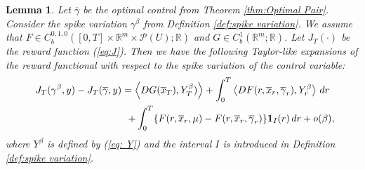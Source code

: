 \documentclass[12pt,reqno]{amsart}
\numberwithin{equation}{section}  %
\newcommand{\1}{{\bf 1}}
\newcommand{\2}{{\bf 2}}
\newcommand{\R}{\mathbb R}
\newcommand{\ga}{\gamma}
\newtheorem{lemma}[theorem]{Lemma}
\theoremstyle{remark}
\theoremstyle{remark}
\begin{document}
\begin{lemma}\label{lem: Taylor J}Let $\overline{\ga}$ be the optimal control from Theorem \ref{thm:Optimal Pair}. Consider the spike variation $\ga^{\beta}$ from Definition \ref{def:spike variation}. We assume that $F\in C_{b}^{0,1,0}([0,T]\times\R^m\times \mathcal{P}(U);\R)$ and $G\in C_{b}^{1}(\R^{m};\R)$. Let $J_{T}(\cdot)$ be the reward function (\ref{eq:J}). Then we have the following Taylor-like expansions of the reward functional with respect to the spike variation of the control variable:
    \begin{multline} \label{eq: Taylor J} J_{T}(\gamma^{\beta},y)-J_{T}(\overline{\gamma},y)=\left<DG(\overline{x}_{T}),Y_{T}^{\beta}) \right>+\int_{0}^{T} \left<DF(r,\overline{x}_{r},\overline{\gamma}_{r}),Y_{r}^{\beta}\right>\, dr \\ \hspace{3.5cm} + \int_{0}^{T}\{F(r,\overline{x}_{r},\mu)-F(r,\overline{x}_{r},\overline{\gamma}_{r})\}\mathbf{1}_{I}(r)\,dr +o(\beta),
    \end{multline}
    where $Y^{\beta}$ is defined by (\ref{eq: Y}) and the interval $I$ is introduced in Definition \ref{def:spike variation}.
\end{lemma}
\end{document}
